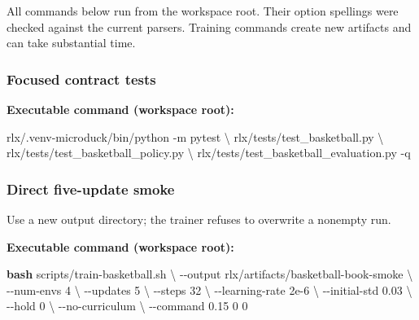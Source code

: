 \documentclass[
  american,
  11pt,
  letterpaper,
]{article}
\newenvironment{Shaded}{\begin{snugshade}}{\end{snugshade}}
\newcommand{\AttributeTok}[1]{\textcolor[rgb]{0.13,0.29,0.53}{#1}}
\newcommand{\DataTypeTok}[1]{\textcolor[rgb]{0.13,0.29,0.53}{#1}}
\newcommand{\ExtensionTok}[1]{#1}
\newcommand{\FunctionTok}[1]{\textcolor[rgb]{0.13,0.29,0.53}{\textbf{#1}}}
\newcommand{\NormalTok}[1]{#1}
\newcounter{none} %
\renewenvironment{Shaded}{\par\smallskip}{\par\smallskip}
\begin{document}
All commands below run from the workspace root. Their option spellings
were checked against the current parsers. Training commands create new
artifacts and can take substantial time.

\subsubsection{Focused contract tests}\label{focused-contract-tests}

\textbf{Executable command (workspace root):}

\begin{Shaded}
\begin{Highlighting}[]
\ExtensionTok{rlx/.venv{-}microduck/bin/python} \AttributeTok{{-}m}\NormalTok{ pytest }\DataTypeTok{\textbackslash{}}
\NormalTok{  rlx/tests/test\_basketball.py }\DataTypeTok{\textbackslash{}}
\NormalTok{  rlx/tests/test\_basketball\_policy.py }\DataTypeTok{\textbackslash{}}
\NormalTok{  rlx/tests/test\_basketball\_evaluation.py }\AttributeTok{{-}q}
\end{Highlighting}
\end{Shaded}

\subsubsection{Direct five-update smoke}\label{direct-five-update-smoke}

Use a new output directory; the trainer refuses to overwrite a nonempty
run.

\textbf{Executable command (workspace root):}

\begin{Shaded}
\begin{Highlighting}[]
\FunctionTok{bash}\NormalTok{ scripts/train{-}basketball.sh }\DataTypeTok{\textbackslash{}}
  \AttributeTok{{-}{-}output}\NormalTok{ rlx/artifacts/basketball{-}book{-}smoke }\DataTypeTok{\textbackslash{}}
  \AttributeTok{{-}{-}num{-}envs}\NormalTok{ 4 }\DataTypeTok{\textbackslash{}}
  \AttributeTok{{-}{-}updates}\NormalTok{ 5 }\DataTypeTok{\textbackslash{}}
  \AttributeTok{{-}{-}steps}\NormalTok{ 32 }\DataTypeTok{\textbackslash{}}
  \AttributeTok{{-}{-}learning{-}rate}\NormalTok{ 2e{-}6 }\DataTypeTok{\textbackslash{}}
  \AttributeTok{{-}{-}initial{-}std}\NormalTok{ 0.03 }\DataTypeTok{\textbackslash{}}
  \AttributeTok{{-}{-}hold}\NormalTok{ 0 }\DataTypeTok{\textbackslash{}}
  \AttributeTok{{-}{-}no{-}curriculum} \DataTypeTok{\textbackslash{}}
  \AttributeTok{{-}{-}command}\NormalTok{ 0.15 0 0}
\end{Highlighting}
\end{Shaded}
\end{document}
